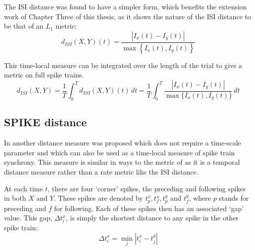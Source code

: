 The ISI distance was found to have a simpler form, which benefits the extension work of Chapter Three of this thesis, as it shows the nature of the ISI distance to be that of an $L_1$ metric:
\begin{equation}
d_{ISI}(X,Y)(t) = \frac{| I_x(t) - I_y(t) |}{\max \left\{ I_x(t), I_y(t)\right\}}
\end{equation}

This time-local measure can be integrated over the length of the trial to give a metric on full spike trains.
\begin{equation}
d_{ISI}(X,Y) = \frac{1}{T}\int_0^T d_{ISI}(X,Y)(t)\,dt = \frac{1}{T}\int_0^T \frac{| I_x(t) - I_y(t) |}{\max \{I_x(t),I_y(t)\}}\, dt
\end{equation}


\subsection{SPIKE distance}
In \citep{KreuzEtAl2011a,KreuzEtAl2012a} another distance measure was proposed which does not require a time-scale parameter and which can also be used as a time-local measure of spike train synchrony.  This measure is similar in ways to the metric of \citet{VictorPurpura1997a} as it is a temporal distance measure rather than a rate metric like the ISI distance.

At each time $t$, there are four \lq{}corner\rq{} spikes,  the preceding and following spikes in both $X$ and $Y$. These spikes are denoted by $t^x_p, t^x_f, t^y_p$ and $t^y_f$, where $p$ stands for preceding and $f$ for following.  Each of these spikes then has an associated \lq{}gap\rq{} value.  This gap, $\Delta t^x_i$, is simply the shortest distance to any spike in the other spike train:
\begin{equation}
\Delta t^x_i = \min_j | t^x_i - t^y_j |
\end{equation}

